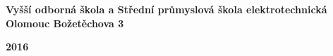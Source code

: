 \begin{titlepage}
	\centering

	\begin{figure}[H]
		\centering
		\vspace{-20pt}
		
	\end{figure}
	{\LARGE \bfseries Vyšší odborná škola a Střední průmyslová škola elektrotechnická Olomouc Božetěchova 3}

	\vspace*{\fill}


	\vfill

	{\LARGE \bfseries 2016 \hfill \theauthor}
\end{titlepage}